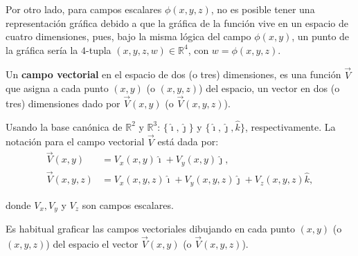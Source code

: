 Por otro lado, para campos escalares $\phi(x,y,z)$, no es posible tener una representación gráfica debido a que la gráfica de la función vive en un espacio de  cuatro dimensiones, pues, bajo la misma lógica del campo $\phi(x,y)$, un punto de la gráfica sería la $4$-tupla $(x,y,z,w) \in \mathbb{R}^4$, con $w = \phi(x,y,z)$. 

 
Un \textbf{campo vectorial} en el espacio de dos (o tres) dimensiones, es una función $\vec{V}$ que asigna a cada punto $(x,y)$ (o $(x,y,z)$) del espacio, un vector en dos (o tres) dimensiones dado por $\vec{V}(x,y)$ (o $\vec{V}(x,y,z)$).

Usando la base canónica de $\mathbb{R}^2$ y $\mathbb{R}^3$: $\{\hat{\imath},\hat{\jmath}\}$ y $\{\hat{\imath},\hat{\jmath}, \hat{k}\}$,  respectivamente. La notación para el campo vectorial $\vec{V}$ está dada por:
\begin{align*}
    \vec{V} (x,y) &= V_x(x,y) \hat{\imath} + V_y(x,y) \hat{\jmath}, \\
    \vec{V}(x,y,z) &= V_x(x,y,z) \hat{\imath} + V_y(x,y,z) \hat{\jmath} + V_z(x,y,z) \hat{k},   
\end{align*}

donde $V_x, V_y$ y $V_z$ son campos escalares.

Es habitual graficar las campos vectoriales dibujando en cada punto $(x,y)$ (o $(x,y,z)$) del espacio el vector $\Vec{V}(x,y)$ (o $\Vec{V}(x,y,z)$).

